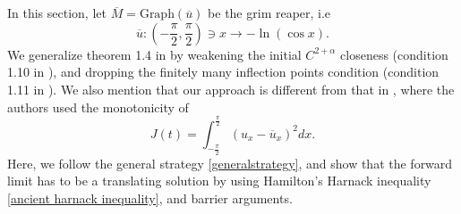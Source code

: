 \documentclass[pdflatex,sn-mathphys-num]{sn-jnl}%
\begin{document}
\section{}\label{dynamical stability of grim reaper section}
In this section, let $\overline{M} = \text{Graph}(\overline{u})$ be the grim reaper, i.e
\begin{equation}
    \overline{u} : (-\frac{\pi}{2}, \frac{\pi}{2}) \ni x \to -\ln(\cos x).
\end{equation}
We generalize theorem 1.4 in \cite{WANG_WO_2011} by weakening the initial $C^{2+\alpha}$ closeness (condition 1.10 in \cite{WANG_WO_2011}), and dropping the finitely many inflection points condition (condition 1.11 in \cite{WANG_WO_2011}). We also mention that our approach is different from that in \cite{WANG_WO_2011}, where the authors used the monotonicity of
\begin{equation}
    J(t) = \int_{-\frac{\pi}{2}}^{\frac{\pi}{2}}(u_x - \overline{u}_x)^2dx. 
\end{equation}
Here, we follow the general strategy \ref{generalstrategy}, and show that the forward limit has to be a translating solution by using Hamilton's Harnack inequality \eqref{ancient harnack inequality}, and barrier arguments. \\
\end{document}
